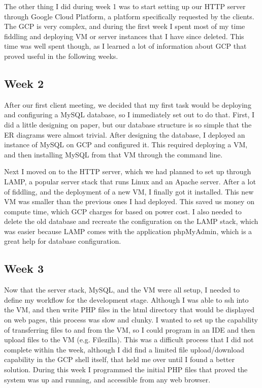 \documentclass[IEEEtran,letterpaper,10pt,titlepage,fleqn,draftclsnofoot,onecolumn]{article}
\begin{document}
The other thing I did during week 1 was to start setting up our HTTP server through Google Cloud Platform, a platform specifically requested by the clients. The GCP is very complex, and during the first week I spent most of my time fiddling and deploying VM or server instances that I have since deleted. This time was well spent though, as I learned a lot of information about GCP that proved useful in the following weeks. 

\subsection{Week 2}

After our first client meeting, we decided that my first task would be deploying and configuring a MySQL database, so I immediately set out to do that. First, I did a little designing on paper, but our database structure is so simple that the ER diagrams were almost trivial. After designing the database, I deployed an instance of MySQL on GCP and configured it. This required deploying a VM, and then installing MySQL from that VM through the command line. 

Next I moved on to the HTTP server, which we had planned to set up through LAMP, a popular server stack that runs Linux and an Apache server. After a lot of fiddling, and the deployment of a new VM, I finally got it installed. This new VM was smaller than the previous ones I had deployed. This saved us money on compute time, which GCP charges for based on power cost. I also needed to delete the old database and recreate the configuration on the LAMP stack, which was easier because LAMP comes with the application phpMyAdmin, which is a great help for database configuration. 

\subsection{Week 3}

Now that the server stack, MySQL, and the VM were all setup, I needed to define my workflow for the development stage. Although I was able to ssh into the VM, and then write PHP files in the html directory that would be displayed on web pages, this process was slow and clunky. I wanted to set up the capability of transferring files to and from the VM, so I could program in an IDE and then upload files to the VM (e.g. Filezilla). This was a difficult process that I did not complete within the week, although I did find a limited file upload/download capability in the GCP shell itself, that held me over until I found a better solution. During this week I programmed the initial PHP files that proved the system was up and running, and accessible from any web browser. 
\end{document}
